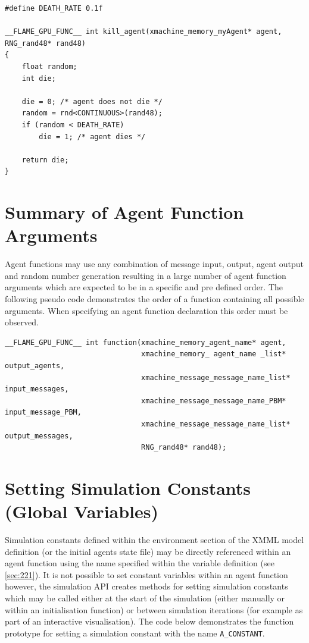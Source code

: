\documentclass[11pt, a4paper, onecolumn, oneside]{report}
\begin{document}
\begin{lstlisting}[language=C_]
#define DEATH_RATE 0.1f

__FLAME_GPU_FUNC__ int kill_agent(xmachine_memory_myAgent* agent, RNG_rand48* rand48)
{
    float random;
    int die;

    die = 0; /* agent does not die */
    random = rnd<CONTINUOUS>(rand48);
    if (random < DEATH_RATE)
        die = 1; /* agent dies */
    
    return die;
}
\end{lstlisting}

\section{Summary of Agent Function Arguments}
\label{sec:38}


Agent functions may use any combination of message input, output, agent output and random number generation resulting in a large number of agent function arguments which are expected to be in a specific and pre defined order.
The following pseudo code demonstrates the order of a function containing all possible arguments.
When specifying an agent function declaration this order must be observed.

\begin{lstlisting}[language=C_]
__FLAME_GPU_FUNC__ int function(xmachine_memory_agent_name* agent,
                                xmachine_memory_ agent_name _list* output_agents,
                                xmachine_message_message_name_list* input_messages,
                                xmachine_message_message_name_PBM* input_message_PBM,
                                xmachine_message_message_name_list* output_messages,
                                RNG_rand48* rand48);
\end{lstlisting}

\section{Setting Simulation Constants (Global Variables)}
\label{sec:39}


Simulation constants defined within the environment section of the XMML model definition (or the initial agents state file) may be directly referenced within an agent function using the name specified within the variable definition (see \cref{sec:221}).
It is not possible to set constant variables within an agent function however, the simulation API creates methods for setting simulation constants which may be called either at the start of the simulation (either manually or within an initialisation function) or between simulation iterations (for example as part of an interactive visualisation).
The code below demonstrates the function prototype for setting a simulation constant with the name \verb|A_CONSTANT|.
\end{document}
